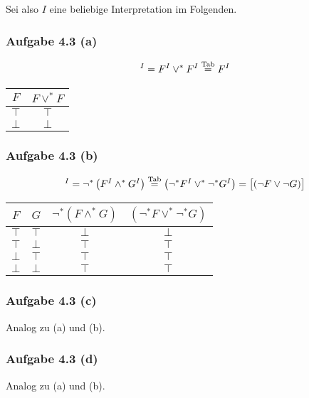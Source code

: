 Sei also $I$ eine beliebige Interpretation im Folgenden.

\subsubsection{Aufgabe 4.3 (a)}
\begin{align*}
	[(F\vee F)]^I=F^I\vee^\ast F^I\stackeq{\text{Tab}} F^I
\end{align*}
\begin{tabular}{c||c}
	$F$ & $F\vee^\ast F$\\ \hline
	$\top$ & $\top$\\%
	$\bot$ & $\bot$ %
\end{tabular}

\subsubsection{Aufgabe 4.3 (b)}
\begin{align*}
	[\neg(F\wedge G)]^I=\neg^\ast\left(F^I\wedge^\ast G^I\right)\stackeq{\text{Tab}}
	\left(\neg^\ast F^I\vee^\ast\neg^\ast G^I\right)=\big[(\neg F\vee\neg G)\big]
\end{align*}

\begin{tabular}{c|c||c|c}
	$F$ & $G$ & $\neg^\ast(F\wedge^\ast G)$ & $(\neg^\ast F\vee^\ast\neg^\ast G)$\\ \hline
	$\top$ & $\top$ & $\bot$ & $\bot$\\
	$\top$ & $\bot$ & $\top$ & $\top$\\
	$\bot$ & $\top$ & $\top$ & $\top$\\
	$\bot$ & $\bot$ & $\top$ & $\top$
\end{tabular}

\subsubsection{Aufgabe 4.3 (c)}
Analog zu (a) und (b).

\subsubsection{Aufgabe 4.3 (d)}
Analog zu (a) und (b).

